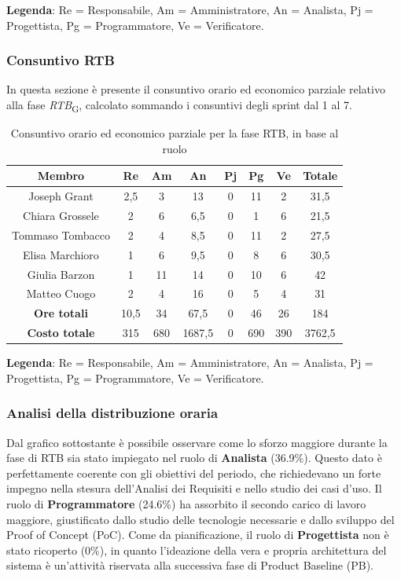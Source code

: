 \documentclass[11pt,a4paper]{article}
\begin{document}
\textbf{Legenda}: Re = Responsabile, Am = Amministratore, An = Analista, Pj = Progettista, Pg = Programmatore, Ve = Verificatore.

\subsubsection{Consuntivo RTB}
In questa sezione è presente il consuntivo orario ed economico parziale relativo alla fase \textit{RTB}\textsubscript{G}, calcolato sommando i consuntivi degli sprint dal 1 al 7.

\begin{table}[H]
    \centering
    \begin{tabular}{|c|c|c|c|c|c|c|c|}
        \hline
        \textbf{Membro} & \textbf{Re} & \textbf{Am} & \textbf{An} & \textbf{Pj} & \textbf{Pg} & \textbf{Ve} & \textbf{Totale} \\
        \hline
        Joseph Grant & 2,5 & 3 & 13 & 0 & 11 & 2 & 31,5 \\
        Chiara Grossele & 2 & 6 & 6,5 & 0 & 1 & 6 & 21,5 \\
        Tommaso Tombacco & 2 & 4 & 8,5 & 0 & 11 & 2 & 27,5 \\
        Elisa Marchioro & 1 & 6 & 9,5 & 0 & 8 & 6 & 30,5 \\
        Giulia Barzon & 1 & 11 & 14 & 0 & 10 & 6 & 42 \\
        Matteo Cuogo & 2 & 4 & 16 & 0 & 5 & 4 & 31 \\
        \hline
        \textbf{Ore totali} & 10,5 & 34 & 67,5 & 0 & 46 & 26 & 184 \\
        \hline
        \textbf{Costo totale} & 315 & 680 & 1687,5 & 0 & 690 & 390 & 3762,5 \\
        \hline
    \end{tabular}
    \caption{Consuntivo orario ed economico parziale per la fase RTB, in base al ruolo}
\end{table}

\textbf{Legenda}: Re = Responsabile, Am = Amministratore, An = Analista, Pj = Progettista, Pg = Programmatore, Ve = Verificatore.


\subsubsection{Analisi della distribuzione oraria}
Dal grafico sottostante è possibile osservare come lo sforzo maggiore durante la fase di RTB sia stato impiegato nel ruolo di \textbf{Analista} (36.9\%). Questo dato è perfettamente coerente con gli obiettivi del periodo, che richiedevano un forte impegno nella stesura dell'Analisi dei Requisiti e nello studio dei casi d'uso. 
Il ruolo di \textbf{Programmatore} (24.6\%) ha assorbito il secondo carico di lavoro maggiore, giustificato dallo studio delle tecnologie necessarie e dallo sviluppo del Proof of Concept (PoC).
Come da pianificazione, il ruolo di \textbf{Progettista} non è stato ricoperto (0\%), in quanto l'ideazione della vera e propria architettura del sistema è un'attività riservata alla successiva fase di Product Baseline (PB).
\end{document}
